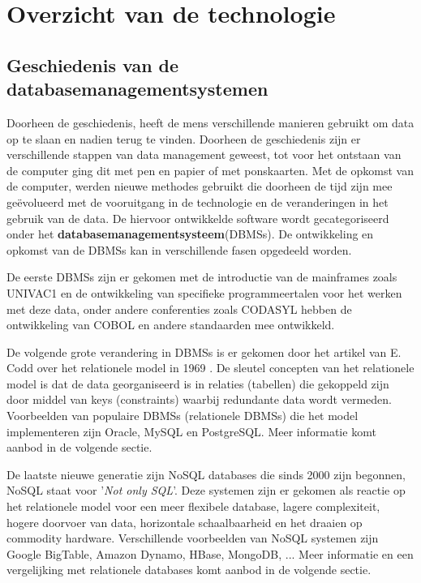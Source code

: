 \chapter{Overzicht van de technologie}
\section{Geschiedenis van de databasemanagementsystemen}
Doorheen de geschiedenis, heeft de mens verschillende manieren gebruikt om data op te slaan en nadien terug te vinden. Doorheen de geschiedenis zijn er verschillende stappen van data management geweest, tot voor het ontstaan van de computer ging dit met pen en papier of met ponskaarten\cite{gray2007data}. Met de opkomst van de computer, werden nieuwe methodes gebruikt die doorheen de tijd zijn mee geëvolueerd met de vooruitgang in de technologie en de veranderingen in het gebruik van de data. De hiervoor ontwikkelde software wordt gecategoriseerd onder het \textbf{databasemanagementsysteem}(\glspl{DBMS}). De ontwikkeling en opkomst van de \glspl{DBMS} kan in verschillende fasen opgedeeld worden.  

De eerste \glspl{DBMS} zijn er gekomen met de introductie van de mainframes zoals UNIVAC1 en de ontwikkeling van specifieke programmeertalen voor het werken met deze data, onder andere conferenties zoals CODASYL hebben de ontwikkeling van COBOL en andere standaarden mee ontwikkeld\cite{gray2007data}.    

De volgende grote verandering in \glspl{DBMS} is er gekomen door het artikel van E. Codd over het relationele model in 1969 \cite{codd1970relational}. De sleutel concepten van het relationele model is dat de data georganiseerd is in relaties (tabellen) die gekoppeld zijn door middel van keys (constraints) waarbij redundante data wordt vermeden. 
Voorbeelden van populaire \glspl{DBMS} (relationele \glspl{DBMS}) die het model implementeren zijn Oracle, MySQL en PostgreSQL. Meer informatie komt aanbod in de volgende sectie. 

De laatste nieuwe generatie zijn NoSQL databases die sinds 2000 zijn begonnen, NoSQL staat voor '\textit{Not only SQL}'. Deze systemen zijn er gekomen als reactie op het relationele model voor een meer flexibele database, lagere complexiteit, hogere doorvoer van data, horizontale schaalbaarheid en het draaien op commodity hardware.  Verschillende voorbeelden van NoSQL systemen zijn Google BigTable, Amazon Dynamo, HBase, MongoDB, ... \cite{Strauch.NoSQL} Meer informatie en een vergelijking met relationele databases komt aanbod in de volgende sectie. 

